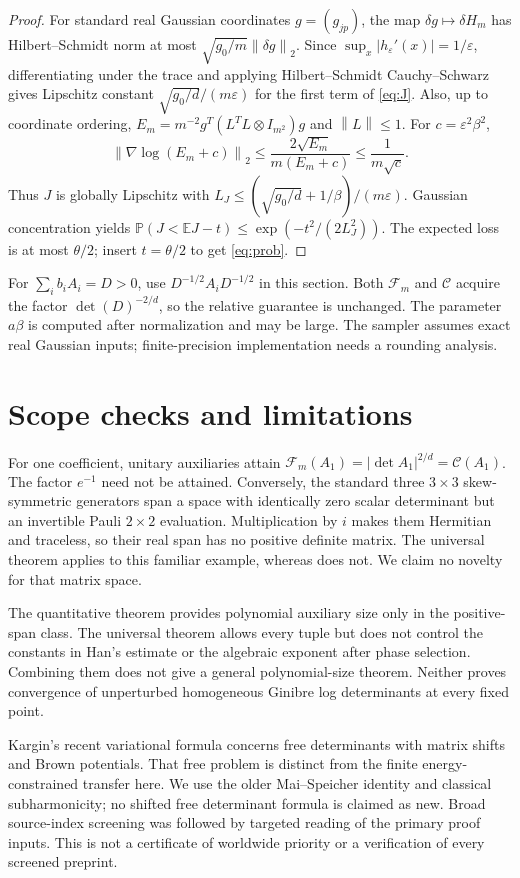 \documentclass[11pt]{article}
\newcommand{\E}{\mathbb E}
\newcommand{\Prob}{\mathbb P}
\newcommand{\F}{\mathcal F}
\newcommand{\K}{\mathcal C}
\newcommand{\norm}[1]{\left\lVert#1\right\rVert}
\begin{document}
\begin{proof}
For standard real Gaussian coordinates $g=(g_{jp})$, the map $\delta g\mapsto\delta H_m$ has Hilbert--Schmidt norm at most $\sqrt{g_0/m}\norm{\delta g}_2$. Since $\sup_x|h_\varepsilon'(x)|=1/\varepsilon$, differentiating under the trace and applying Hilbert--Schmidt Cauchy--Schwarz gives Lipschitz constant $\sqrt{g_0/d}/(m\varepsilon)$ for the first term of \eqref{eq:J}.
Also, up to coordinate ordering, $E_m=m^{-2}g^T(L^TL\otimes I_{m^2})g$ and $\norm L\le1$. For $c=\varepsilon^2\beta^2$,
\[
 \norm{\nabla\log(E_m+c)}_2\le\frac{2\sqrt{E_m}}{m(E_m+c)}\le\frac1{m\sqrt c}.
\]
Thus $J$ is globally Lipschitz with $L_J\le(\sqrt{g_0/d}+1/\beta)/(m\varepsilon)$. Gaussian concentration \cite{agz} yields $\Prob(J<\E J-t)\le\exp(-t^2/(2L_J^2))$. The expected loss is at most $\theta/2$; insert $t=\theta/2$ to get \eqref{eq:prob}.
\end{proof}
For $\sum_i b_iA_i=D>0$, use $D^{-1/2}A_iD^{-1/2}$ in this section. Both $\F_m$ and $\K$ acquire the factor $\det(D)^{-2/d}$, so the relative guarantee is unchanged. The parameter $a\beta$ is computed after normalization and may be large. The sampler assumes exact real Gaussian inputs; finite-precision implementation needs a rounding analysis.

\section{Scope checks and limitations}
For one coefficient, unitary auxiliaries attain $\F_m(A_1)=|\det A_1|^{2/d}=\K(A_1)$. The factor $e^{-1}$ need not be attained. Conversely, the standard three $3\times3$ skew-symmetric generators span a space with identically zero scalar determinant but an invertible Pauli $2\times2$ evaluation. Multiplication by $i$ makes them Hermitian and traceless, so their real span has no positive definite matrix. The universal theorem applies to this familiar example, whereas \cite{bridge} does not. We claim no novelty for that matrix space.

The quantitative theorem provides polynomial auxiliary size only in the positive-span class. The universal theorem allows every tuple but does not control the constants in Han's estimate or the algebraic exponent after phase selection. Combining them does not give a general polynomial-size theorem. Neither proves convergence of unperturbed homogeneous Ginibre log determinants at every fixed point.

Kargin's recent variational formula \cite{kargin} concerns free determinants with matrix shifts and Brown potentials. That free problem is distinct from the finite energy-constrained transfer here. We use the older Mai--Speicher identity and classical subharmonicity; no shifted free determinant formula is claimed as new. Broad source-index screening was followed by targeted reading of the primary proof inputs. This is not a certificate of worldwide priority or a verification of every screened preprint.
\end{document}
